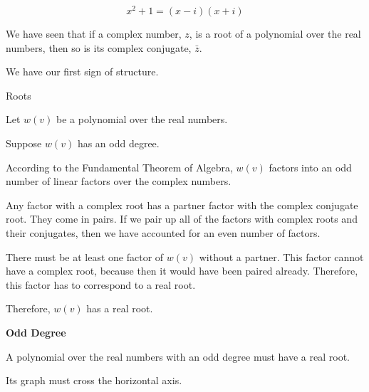 \documentclass{ximera}
\begin{document}
\[  x^2 + 1 = (x - i)(x + i)       \]



We have seen that if a complex number, $z$, is a root of a polynomial over the real numbers, then so is its complex conjugate, $\bar{z}$.

We have our first sign of structure.




\begin{example} Roots

Let $w(v)$ be a polynomial over the real numbers.

Suppose $w(v)$ has an odd degree.


According to the Fundamental Theorem of Algebra, $w(v)$ factors into an odd number of linear factors over the complex numbers.

Any factor with a complex root has a partner factor with the complex conjugate root.  They come in pairs.  If we pair up all of the factors with complex roots and their conjugates, then we have accounted for an even number of factors.  

There must be at least one factor of $w(v)$ without a partner.  This factor cannot have a complex root, because then it would have been paired already.  Therefore, this factor has to correspond to a real root.

Therefore, $w(v)$ has a real root.




\end{example}








\begin{theorem} \textbf{\textcolor{blue!55!black}{Odd Degree}} 

A polynomial over the real numbers with an odd degree must have a real root.

Its graph must cross the horizontal axis.

\end{theorem}
\end{document}
